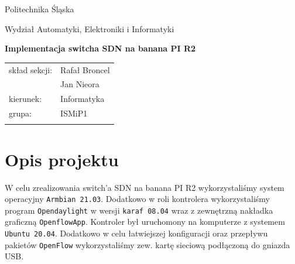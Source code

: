 \documentclass[12pt,a4paper,twoside]{article}
\begin{document}
\frenchspacing
\thispagestyle{empty}
\begin{center}
{\Large\sf Politechnika Śląska   %

Wydział Automatyki, Elektroniki i Informatyki

}

\vfill

 

\vfill\vfill

{\Huge\sffamily\bfseries Implementacja switcha SDN na banana PI R2\par}  

\vfill\vfill

{\LARGE\sf }   


\vfill \vfill\vfill\vfill






\begin{tabular}{ll}
	\toprule
	skład sekcji:	&	Rafał Broncel\\
					&	Jan Nieora\\
	kierunek:		& Informatyka\\
	grupa: 			& ISMiP1 \\
	
	\bottomrule
	                            &
\end{tabular}

\end{center}

\cleardoublepage


\section{Opis projektu}
W celu zrealizowania  switch'a SDN na banana PI R2 wykorzystaliśmy system operacyjny \texttt{Armbian 21.03}. Dodatkowo w roli kontrolera wykorzystaliśmy program \texttt{Opendaylight} w wersji \texttt{karaf 08.04} wraz z zewnętrzną nakładka graficzną \texttt{OpenflowApp}. Kontroler był uruchomony na komputerze z systemem \texttt{Ubuntu 20.04}. Dodatkowo w celu łatwiejszej konfiguracji oraz przepływu pakietów \texttt{OpenFlow} wykorzystaliśmy zew. kartę sieciową podłączoną do gniazda USB.
\end{document}
